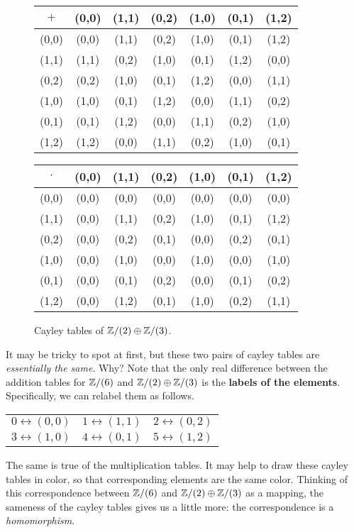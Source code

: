 \begin{figure}[h!]
\begin{center}
\begin{tabular}{c|cccccc}
\(+\) & (0,0) & (1,1) & (0,2) & (1,0) & (0,1) & (1,2) \\ \hline
(0,0) & (0,0) & (1,1) & (0,2) & (1,0) & (0,1) & (1,2) \\
(1,1) & (1,1) & (0,2) & (1,0) & (0,1) & (1,2) & (0,0) \\
(0,2) & (0,2) & (1,0) & (0,1) & (1,2) & (0,0) & (1,1) \\
(1,0) & (1,0) & (0,1) & (1,2) & (0,0) & (1,1) & (0,2) \\
(0,1) & (0,1) & (1,2) & (0,0) & (1,1) & (0,2) & (1,0) \\
(1,2) & (1,2) & (0,0) & (1,1) & (0,2) & (1,0) & (0,1)
\end{tabular}

\vspace{0.5cm}

\begin{tabular}{c|cccccc}
\(\cdot\) & (0,0) & (1,1) & (0,2) & (1,0) & (0,1) & (1,2) \\ \hline
(0,0)     & (0,0) & (0,0) & (0,0) & (0,0) & (0,0) & (0,0) \\
(1,1)     & (0,0) & (1,1) & (0,2) & (1,0) & (0,1) & (1,2) \\
(0,2)     & (0,0) & (0,2) & (0,1) & (0,0) & (0,2) & (0,1) \\
(1,0)     & (0,0) & (1,0) & (0,0) & (1,0) & (0,0) & (1,0) \\
(0,1)     & (0,0) & (0,1) & (0,2) & (0,0) & (0,1) & (0,2) \\
(1,2)     & (0,0) & (1,2) & (0,1) & (1,0) & (0,2) & (1,1) \\
\end{tabular}
\caption{\label{fig:cayley-zz2-zz3} Cayley tables of \(\mathbb{Z}/(2) \oplus \mathbb{Z}/(3)\).}
\end{center}
\end{figure}
It may be tricky to spot at first, but these two pairs of cayley tables are \emph{essentially the same}.
Why?
Note that the only real difference between the addition tables for \(\mathbb{Z}/(6)\) and \(\mathbb{Z}/(2) \oplus \mathbb{Z}/(3)\) is the \textbf{labels of the elements}.
Specifically, we can relabel them as follows.
\begin{center}
\begin{tabular}{ccc}
\(0 \leftrightarrow (0,0)\) & \(1 \leftrightarrow (1,1)\) & \(2 \leftrightarrow (0,2)\) \\
\(3 \leftrightarrow (1,0)\) & \(4 \leftrightarrow (0,1)\) & \(5 \leftrightarrow (1,2)\)
\end{tabular}
\end{center}
The same is true of the multiplication tables.
It may help to draw these cayley tables in color, so that corresponding elements are the same color.
Thinking of this correspondence between \(\mathbb{Z}/(6)\) and \(\mathbb{Z}/(2) \oplus \mathbb{Z}/(3)\) as a mapping, the sameness of the cayley tables gives us a little more: the correspondence is a \emph{homomorphism}.

